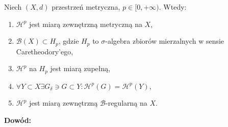 \begin{tw}
	Niech $(X,d)$ przestrzeń metryczna, $p \in [0, +\infty)$. Wtedy:
	\begin{enumerate}
		\item $\mathcal{H}^p$ jest miarą zewnętrzną metryczną na $X$,
		\item $\mathcal{B}(X) \subset H_p$, gdzie $H_p$ to $\sigma$-algebra zbiorów mierzalnych w sensie Caretheodory'ego,
		\item $\mathcal{H}^p$ na $H_p$ jest miarą zupełną,
		\item $\forall Y \subset X \exists G_{\delta} \ni G \subset Y: \mathcal{H}^p(G) = \mathcal{H}^p(Y)$,
		\item $\mathcal{H}^p$ jest miarą zewnętrzną $\mathcal{B}$-regularną na $X$.
	\end{enumerate}

	\textbf{Dowód:} \citep[2.51]{Tworzewski}
\end{tw}